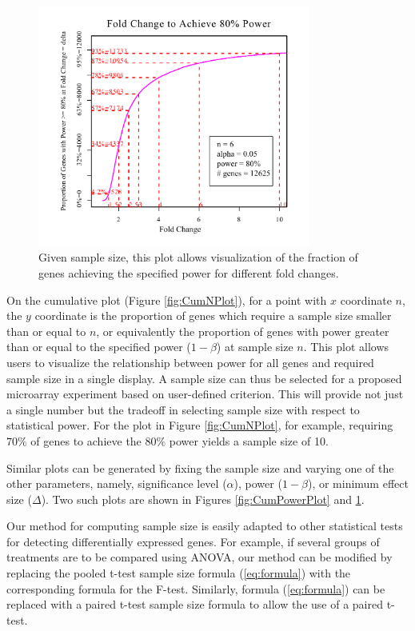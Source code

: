 \documentclass[12pt]{article}
\begin{document}
\begin{figure}%
  \caption[Given Sample Size, Fold Change (Effect Size) Necessary to
    Achieving a Specified Power]{Given sample size, this plot allows
    visualization of the fraction of genes achieving the specified
    power for different fold changes.}
  \label{fig:CumFoldChangePlot}
  \centerline{\includegraphics*[width=0.8\textwidth]{CumFoldChangePlotP.pdf}}
\end{figure}

On the cumulative plot (Figure \ref{fig:CumNPlot}), for a point
with $x$ coordinate $n$, the $y$ coordinate is the proportion of
genes which require a sample size smaller than or equal to $n$, or
equivalently the proportion of genes with power greater than or
equal to the specified power ($1-\beta$) at sample size $n$. This
plot allows users to visualize the relationship between power for
all genes and required sample size in a single display.  A sample
size can thus be selected for a proposed microarray experiment
based on user-defined criterion.  This will provide not just a
single number but the tradeoff in selecting sample size with
respect to statistical power.  For the plot in Figure
\ref{fig:CumNPlot}, for example, requiring $70\%$ of genes to
achieve the $80\%$ power yields a sample size of 10.

Similar plots can be generated by fixing the sample size and
varying one of the other parameters, namely, significance level
($\alpha$), power ($1-\beta$), or minimum effect size ($\Delta$). Two
such plots are shown in Figures \ref{fig:CumPowerPlot} and
\ref{fig:CumFoldChangePlot}.

Our method for computing sample size is easily adapted to other
statistical tests for detecting differentially expressed genes. For
example, if several groups of treatments are to be compared using
ANOVA, our method can be modified by replacing the pooled t-test
sample size formula (\ref{eq:formula}) with the corresponding
formula for the F-test. Similarly, formula (\ref{eq:formula}) can be
replaced with a paired t-test sample size formula to allow the use
of a paired t-test.
\end{document}
